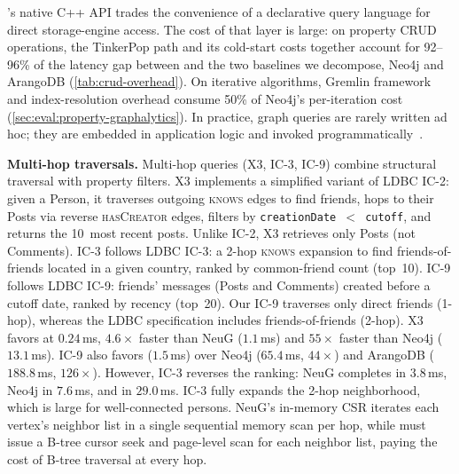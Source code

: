 \project{}'s native C++ API trades the convenience of a declarative query language for direct storage-engine access.
The cost of that layer is large: on property CRUD operations, the TinkerPop path and its cold-start costs together account for 92--96\% of the latency gap between \project{} and the two baselines we decompose, Neo4j and ArangoDB (\autoref{tab:crud-overhead}).
On iterative algorithms, Gremlin framework and index-resolution overhead consume 50\% of Neo4j's per-iteration cost (\autoref{sec:eval:property-graphalytics}).
In practice, graph queries are rarely written ad hoc; they are embedded in application logic and invoked programmatically~\cite{10.1145/3357766.3359541,cheung2013optimizing}.

\textbf{Multi-hop traversals.}
Multi-hop queries (X3, IC-3, IC-9) combine structural traversal
with property filters.
X3 implements a simplified variant of LDBC IC-2: given a Person, it traverses
outgoing \textsc{knows} edges to find friends, hops to their Posts via reverse
\textsc{hasCreator} edges, filters by \texttt{creationDate~$<$~cutoff}, and
returns the 10~most recent posts.
Unlike IC-2, X3 retrieves only Posts (not Comments).
IC-3 follows LDBC IC-3: a 2-hop \textsc{knows} expansion to find
friends-of-friends located in a given country, ranked by common-friend count
(top~10).
IC-9 follows LDBC IC-9: friends' messages (Posts and Comments) created before a
cutoff date, ranked by recency (top~20).
Our IC-9 traverses only direct friends (1-hop), whereas the LDBC specification
includes friends-of-friends (2-hop).
%
X3 favors \project{} at $0.24$\,ms, $4.6\times$ faster than NeuG ($1.1$\,ms) and $55\times$ faster than Neo4j ($13.1$\,ms).
IC-9 also favors \project{} ($1.5$\,ms) over Neo4j ($65.4$\,ms, $44\times$) and ArangoDB ($188.8$\,ms, $126\times$).
However, IC-3 reverses the ranking: NeuG completes in $3.8$\,ms, Neo4j in $7.6$\,ms, and \project{} in $29.0$\,ms.
IC-3 fully expands the 2-hop  neighborhood, which is large for well-connected persons.
NeuG's in-memory CSR iterates each vertex's neighbor list in a single sequential memory scan per hop, while \project{} must issue a \wt{} B-tree cursor seek and page-level scan for each neighbor list, paying the cost of B-tree traversal at every hop.

